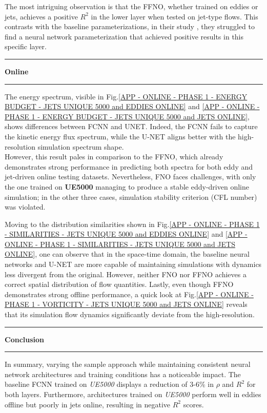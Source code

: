 The most intriguing observation is that the FFNO, whether trained on eddies or jets, achieves a positive $R^2$ in the lower layer when tested on jet-type flows. This contrasts with the baseline parameterizations, in their study \citep{Benchmarking}, they struggled to find a neural network parameterization that achieved positive results in this specific layer.\\

\rule[0cm]{\linewidth}{0.025cm}
\begin{center}
\small \textbf{Online}
\end{center}
\rule[0.3cm]{\linewidth}{0.025cm}

The energy spectrum, visible in Fig.\ref{APP - ONLINE - PHASE 1 - ENERGY BUDGET - JETS UNIQUE 5000 and EDDIES ONLINE} and \ref{APP - ONLINE - PHASE 1 - ENERGY BUDGET - JETS UNIQUE 5000 and JETS ONLINE}, shows differences between FCNN and UNET. Indeed, the FCNN fails to capture the kinetic energy flux spectrum, while the U-NET aligns better with the high-resolution simulation spectrum shape.\\

However, this result pales in comparison to the FFNO, which already demonstrates strong performance in predicting both spectra for both eddy and jet-driven online testing datasets. Nevertheless, FNO faces challenges, with only the one trained on \textbf{UE5000} managing to produce a stable eddy-driven online simulation; in the other three cases, simulation stability criterion (CFL number) was violated.

\newpage

 Moving to the distribution similarities shown in Fig.\ref{APP - ONLINE - PHASE 1 - SIMILARITIES - JETS UNIQUE 5000 and EDDIES ONLINE} and \ref{APP - ONLINE - PHASE 1 - SIMILARITIES - JETS UNIQUE 5000 and JETS ONLINE}, one can observe that in the space-time domain, the baseline neural networks and U-NET are more capable of maintaining simulations with dynamics less divergent from the original. However, neither FNO nor FFNO achieves a correct spatial distribution of flow quantities. Lastly, even though FFNO demonstrates strong offline performance, a quick look at Fig.\ref{APP - ONLINE - PHASE 1 - VORTICITY - JETS UNIQUE 5000 and JETS ONLINE} reveals that its simulation flow dynamics significantly deviate from the high-resolution.\\

\rule[0cm]{\linewidth}{0.025cm}
\begin{center}
\small \textbf{Conclusion}
\end{center}
\rule[0.3cm]{\linewidth}{0.025cm}
In summary, varying the sample approach while maintaining consistent neural network architectures and training conditions has a noticeable impact. The baseline FCNN trained on \textit{UE5000} displays a reduction of 3-6\% in $\rho$ and $R^2$ for both layers. Furthermore, architectures trained on \textit{UE5000} perform well in eddies offline but poorly in jets online, resulting in negative $R^2$ scores.\\


